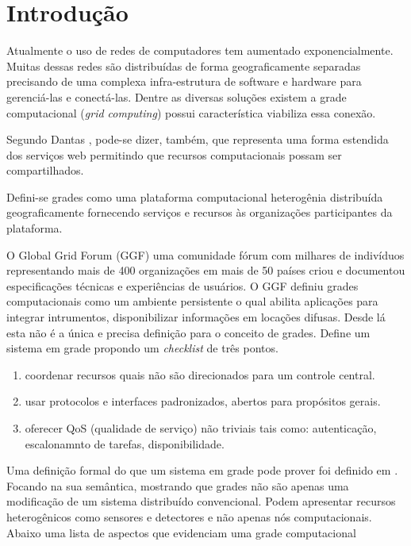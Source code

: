 \section*{Introdução}
\label{cap:introducao}

Atualmente o uso de redes de computadores tem aumentado exponencialmente. Muitas dessas redes são distribuídas de forma geograficamente separadas precisando de uma complexa infra-estrutura de software e hardware para gerenciá-las e conectá-las. Dentre as diversas soluções existem a grade computacional (\emph{grid computing}) possui característica viabiliza essa conexão.

Segundo Dantas \cite{Mangan2006}, pode-se dizer, também, que representa uma forma estendida dos serviços web permitindo que recursos computacionais possam ser compartilhados.

Defini-se grades como uma plataforma computacional heterogênia distribuída geograficamente fornecendo serviços e recursos às organizações participantes da plataforma.

\cite{Mangan2006} O Global Grid Forum (GGF) uma comunidade fórum com milhares de indivíduos representando mais de 400 organizações em mais de 50 países criou e documentou especificações técnicas e experiências de usuários. O GGF definiu grades computacionais como um ambiente persistente o qual abilita aplicações para integrar intrumentos, disponibilizar informações em locações difusas. Desde lá esta não é a única e precisa definição para o conceito de grades. \cite{Kesselman2001} Define um sistema em grade propondo um \emph{checklist} de três pontos.

\begin{enumerate}
	\item coordenar recursos quais não são direcionados para um controle central.
	\item usar protocolos e interfaces padronizados, abertos para propósitos gerais.
	\item oferecer QoS (qualidade de serviço) não triviais tais como: autenticação, escalonamnto de tarefas, disponibilidade.
\end{enumerate}

Uma definição formal do que um sistema em grade pode prover foi definido em \cite{Mangan2006}. Focando na sua semântica, mostrando que grades não são apenas uma modificação de um sistema distribuído convencional. Podem apresentar recursos heterogênicos como sensores e detectores e não apenas nós computacionais. Abaixo uma lista de aspectos que evidenciam uma grade computacional \cite{Cirne2002}

